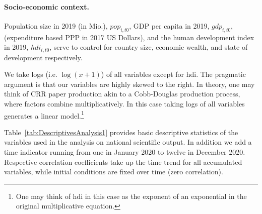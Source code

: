 \paragraph{Socio-economic context.} Population size in 2019 (in Mio.), $pop_{i,t0}$, GDP per capita in 2019, $gdp_{i,t0}$, (expenditure based PPP in 2017 US Dollars), and the human development index in 2019, $hdi_{i,t0}$, serve to control for country size, economic wealth, and state of development respectively.

We take logs (i.e. $\log(x + 1)$) of all variables except for hdi. The pragmatic argument is that our variables are highly skewed to the right. In theory, one may think of CRR paper production akin to a Cobb-Douglas production process, where factors combine multiplicatively. In this case taking logs of all variables generates a linear model.\footnote{One may think of hdi in this case as the exponent of an exponential in the original multiplicative equation.} 

Table~\ref{tab:DescriptivesAnalysis1} provides basic descriptive statistics of the variables used in the analysis on national scientific output. In addition we add a time indicator running from one in January 2020 to twelve in December 2020. Respective correlation coefficients take up the time trend for all accumulated variables, while initial conditions are fixed over time (zero correlation). 

